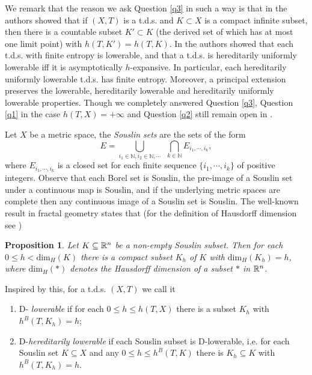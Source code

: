 \documentclass[12pt]{amsart}
\newtheorem{prop}[thm]{Proposition}
\theoremstyle{definition} \theoremstyle{question}
\numberwithin{equation}{section}
\begin{document}
We remark that the reason we ask Question \ref{q3} in such a way is
that in \cite{YZ} the authors showed that if $(X,T)$ is a t.d.s. and
$K\subset X$ is a compact infinite subset, then there is a countable
subset $K'\subset K$ (the derived set of which has at most one limit
point) with $h(T,K')=h(T,K)$. In \cite{HYZ1} the authors showed that
each t.d.s. with finite entropy is lowerable, and that a t.d.s. is
hereditarily uniformly lowerable iff it is asymptotically
$h$-expansive. In particular, each hereditarily uniformly lowerable
t.d.s. has finite entropy. Moreover, a principal extension preserves
the lowerable, hereditarily lowerable and hereditarily uniformly
lowerable properties. Though we completely answered Question
\ref{q3}, Question \ref{q1} in the case $h(T,X)=+\infty$ and
Question \ref{q2}  still remain open in \cite{HYZ1}.

Let $X$ be a metric space, the {\it Souslin sets} are the sets of
the form
\begin{equation*}
E= \bigcup_{i_1\in {\mathbb N}, i_2\in {\mathbb N}, \cdots} \ \ \bigcap_{k\in {\mathbb N}} E_{i_1,
\cdots, i_k},
\end{equation*}
where $E_{i_1, \cdots, i_k}$ is a closed set for each finite
sequence $\{i_1, \cdots, i_k\}$ of positive integers. Observe that
each Borel set is Souslin, the pre-image of a Souslin set under a
continuous map is Souslin,  and if the underlying metric spaces are
complete then any continuous image of a Souslin set is Souslin. The
well-known result in fractal geometry \cite{Fal, M} states that (for
the definition of Hausdorff dimension see \cite{Fal, M})

\begin{prop}\label{prop2.1}
Let $K\subseteq {\Bbb R}^n$ be a non-empty Souslin subset. Then for each
$0\le h< \text{dim}_H (K)$ there is a compact subset $K_h$ of $K$
with $\text{dim}_H (K_h)= h$, where $\text{dim}_H (*)$ denotes the
Hausdorff dimension of a subset $*$ in ${\Bbb R}^n$.
\end{prop}

\noindent Inspired by this, for a t.d.s. $(X, T)$ we call it
\begin{enumerate}

\item D-{\it
lowerable} if for each $0\le h\le h (T, X)$ there is a subset $K_h$
with $h^B (T, K_h)= h$;

\item D-{\it hereditarily lowerable} if each Souslin subset is D-lowerable,
i.e. for each Souslin set $K\subseteq X$ and any $0\le h\le h^B (T,
K)$ there is $K_h\subseteq K$ with $h^B (T, K_h)= h$.
\end{enumerate}
\end{document}
